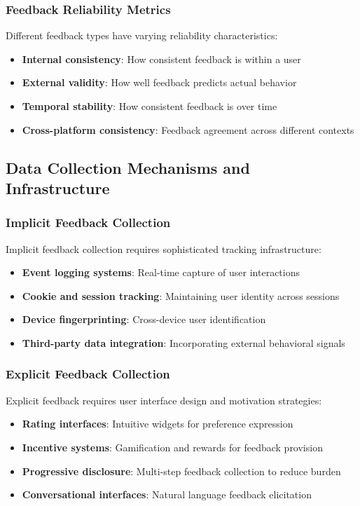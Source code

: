 \subsubsection{Feedback Reliability Metrics}

Different feedback types have varying reliability characteristics:
\begin{itemize}
    \item \textbf{Internal consistency}: How consistent feedback is within a user
    \item \textbf{External validity}: How well feedback predicts actual behavior
    \item \textbf{Temporal stability}: How consistent feedback is over time
    \item \textbf{Cross-platform consistency}: Feedback agreement across different contexts
\end{itemize}

\subsection{Data Collection Mechanisms and Infrastructure}

\subsubsection{Implicit Feedback Collection}

Implicit feedback collection requires sophisticated tracking infrastructure:
\begin{itemize}
    \item \textbf{Event logging systems}: Real-time capture of user interactions
    \item \textbf{Cookie and session tracking}: Maintaining user identity across sessions
    \item \textbf{Device fingerprinting}: Cross-device user identification
    \item \textbf{Third-party data integration}: Incorporating external behavioral signals
\end{itemize}

\subsubsection{Explicit Feedback Collection}

Explicit feedback requires user interface design and motivation strategies:
\begin{itemize}
    \item \textbf{Rating interfaces}: Intuitive widgets for preference expression
    \item \textbf{Incentive systems}: Gamification and rewards for feedback provision
    \item \textbf{Progressive disclosure}: Multi-step feedback collection to reduce burden
    \item \textbf{Conversational interfaces}: Natural language feedback elicitation
\end{itemize}

